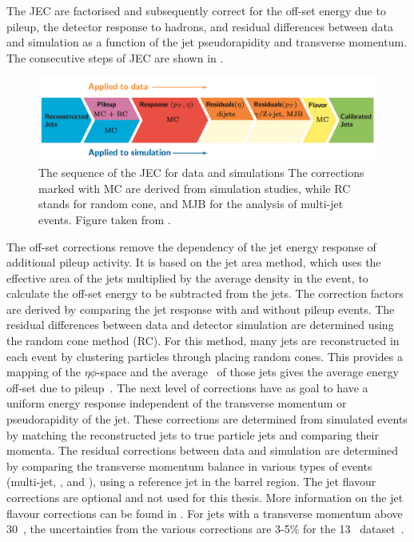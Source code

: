 The JEC are factorised and subsequently correct for the off-set energy due to pileup, the detector response to hadrons, and residual differences between data and simulation as a function of the jet pseudorapidity and transverse momentum.  The consecutive steps of JEC are shown in . 
\begin{figure}[htbp]
	\centering
	\includegraphics[width=1.\linewidth]{4_EventRecoSelect/Figures/JES}
	\caption{The sequence of the JEC for data and simulations The corrections marked with MC are derived from simulation studies, while RC stands for random cone, and MJB for the analysis of multi-jet events. Figure taken from \cite{1748-0221-12-02-P02014}.}
	\label{fig:jes}
\end{figure}
The off-set corrections remove the dependency of the jet energy response of additional pileup activity. It is based on the jet area method, which uses the effective area of the jets multiplied by the average density in the event, to calculate the off-set energy to be subtracted from the jets.  The correction factors are derived by comparing the jet response with and without pileup events. The residual differences between data and detector simulation are determined using the random cone method (RC). For this method, many jets are reconstructed in each event by clustering particles through placing  random cones. This provides a mapping of the $\eta\phi$-space and the average \pt\ of those jets gives the average energy off-set due to pileup~\cite{1748-0221-12-02-P02014}. 
The next level of corrections have as goal to have a uniform energy response independent of the transverse momentum or pseudorapidity of the jet.  These corrections are determined from simulated events by matching the reconstructed jets to true particle jets and comparing their momenta. 
The residual corrections between data and simulation are determined by comparing the transverse momentum balance in various types of events (multi-jet, \Zjets, and \pjets), using a reference jet in the barrel region.  
The jet flavour corrections are optional and not used for this thesis. More information on the jet flavour corrections can be found in \cite{1748-0221-12-02-P02014}. For jets with a transverse momentum above 30~\GeV, the uncertainties from the various corrections are 3-5\% for the 13 \TeV\ dataset~\cite{CMS-DP-2016-020}.


